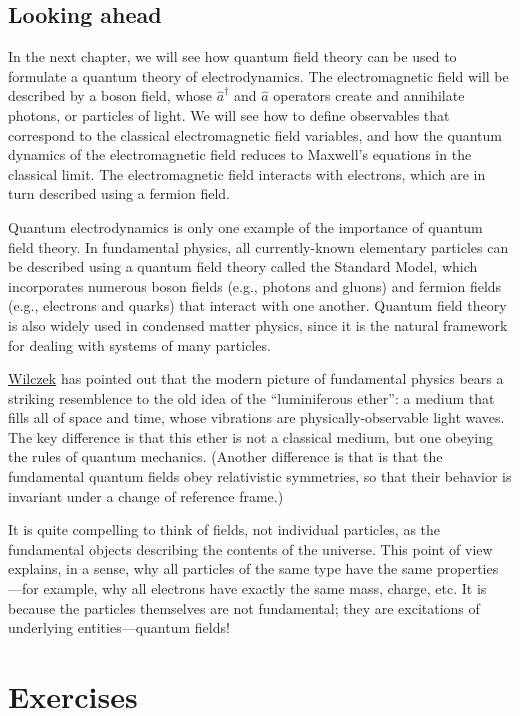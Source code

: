 \documentclass[prx,12pt]{revtex4-2}
\begin{document}
\subsection{Looking ahead}
\label{sec:outlook}

In the next chapter, we will see how quantum field theory can be used
to formulate a quantum theory of electrodynamics.  The electromagnetic
field will be described by a boson field, whose $\hat{a}^\dagger$ and
$\hat{a}$ operators create and annihilate photons, or particles of
light.  We will see how to define observables that correspond to the
classical electromagnetic field variables, and how the quantum
dynamics of the electromagnetic field reduces to Maxwell's equations
in the classical limit.  The electromagnetic field interacts with
electrons, which are in turn described using a fermion field.

Quantum electrodynamics is only one example of the importance of
quantum field theory.  In fundamental physics, all currently-known
elementary particles can be described using a quantum field theory
called the Standard Model, which incorporates numerous boson fields
(e.g., photons and gluons) and fermion fields (e.g., electrons and
quarks) that interact with one another.  Quantum field theory is also
widely used in condensed matter physics, since it is the natural
framework for dealing with systems of many particles.

\hyperref[cite:wilczek]{Wilczek} has pointed out that the modern
picture of fundamental physics bears a striking resemblence to the old
idea of the ``luminiferous ether'': a medium that fills all of space
and time, whose vibrations are physically-observable light waves.  The
key difference is that this ether is not a classical medium, but one
obeying the rules of quantum mechanics.  (Another difference is that
is that the fundamental quantum fields obey relativistic symmetries,
so that their behavior is invariant under a change of reference
frame.)

It is quite compelling to think of fields, not individual particles,
as the fundamental objects describing the contents of the universe.
This point of view explains, in a sense, why all particles of the same
type have the same properties---for example, why all electrons have
exactly the same mass, charge, etc.  It is because the particles
themselves are not fundamental; they are excitations of underlying
entities---quantum fields!

\section*{Exercises}
\end{document}
